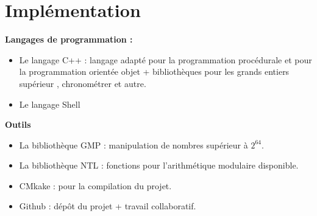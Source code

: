	\section{Implémentation}
		\begin{frame}
		\textbf{Langages de programmation : } \\
		\begin{itemize}
		\item Le langage C++ : langage adapté pour la programmation procédurale et pour la programmation orientée objet +  bibliothèques pour les grands entiers supérieur , chronométrer et autre.\\
		\item Le langage Shell
		\end{itemize} \pause
		\vspace{2em}		
		
		\textbf{Outils}
		\begin{itemize}
			\item La bibliothèque GMP : manipulation de nombres supérieur à $2^{64}$.
			\item La bibliothèque NTL : fonctions pour l'arithmétique modulaire disponible.
			\item CMkake : pour la compilation du projet.
			\item Github : dépôt du projet + travail collaboratif.
		\end{itemize}
		\end{frame}

